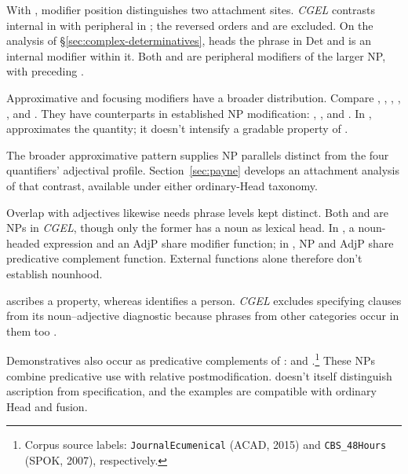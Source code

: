 \documentclass[12pt]{article}
\begin{document}
With , modifier position distinguishes two attachment sites. \textit{CGEL} contrasts internal  in  with peripheral  in  \citep[p.~392, (61)]{huddleston2002}; the reversed orders  and  are excluded. On the analysis of §\ref{sec:complex-determinatives},  heads the phrase in Det and  is an internal modifier within it. Both  and  are peripheral modifiers of the larger NP, with  preceding .

Approximative and focusing modifiers have a broader distribution. Compare , , , , , and . They have counterparts in established NP modification: , , and . In ,  approximates the quantity; it doesn't intensify a gradable property of .

The broader approximative pattern supplies NP parallels distinct from the four quantifiers' adjectival profile. Section~\ref{sec:payne} develops an attachment analysis of that contrast, available under either ordinary-Head taxonomy.

Overlap with adjectives likewise needs phrase levels kept distinct. Both  and  are NPs in \textit{CGEL}, though only the former has a noun as lexical head. In , a noun-headed expression and an AdjP share modifier function; in , NP and AdjP share predicative complement function. External functions alone therefore don't establish nounhood.

 ascribes a property, whereas  identifies a person. \textit{CGEL} excludes specifying  clauses from its noun--adjective diagnostic because phrases from other categories occur in them too \citep[536]{huddleston2002}.

Demonstratives also occur as predicative complements of :  and .\footnote{Corpus source labels: \texttt{JournalEcumenical} (ACAD, 2015) and \texttt{CBS\_48Hours} (SPOK, 2007), respectively.} These NPs combine predicative use with relative postmodification.  doesn't itself distinguish ascription from specification, and the examples are compatible with ordinary Head and fusion.
\end{document}
